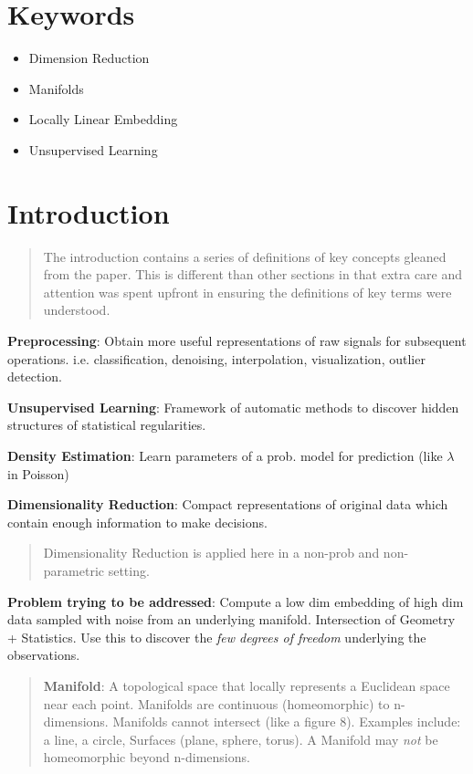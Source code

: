 \documentclass[11pt]{article}
\begin{document}
\section{Keywords}
\label{sec:orgb26bf41}
\begin{itemize}
\item Dimension Reduction
\item Manifolds
\item Locally Linear Embedding
\item Unsupervised Learning
\end{itemize}

\section{Introduction}
\label{sec:org8fafb44}

\begin{quote}
The introduction contains a series of definitions of key concepts gleaned from
the paper. This is different than other sections in that extra care and
attention was spent upfront in ensuring the definitions of key terms were understood.
\end{quote}

\textbf{Preprocessing}: Obtain more useful representations of raw signals for
 subsequent operations. i.e. classification, denoising, interpolation,
 visualization, outlier detection.

\textbf{Unsupervised Learning}: Framework of automatic methods to discover hidden structures of
 statistical regularities.

\textbf{Density Estimation}: Learn parameters of a prob. model for prediction (like \(\lambda\) in
Poisson)

\textbf{Dimensionality Reduction}: Compact representations of original data which
 contain enough information to make decisions.

\begin{quote}
Dimensionality Reduction is applied here in a non-prob and non-parametric setting.
\end{quote}

\textbf{Problem trying to be addressed}: Compute a low dim embedding of high dim data
 sampled with noise from an underlying manifold. Intersection of Geometry +
 Statistics. Use this to discover the \emph{few degrees of freedom} underlying the
 observations.

\begin{quote}
\textbf{Manifold}: A topological space that locally represents a Euclidean space near
 each point. Manifolds are continuous (homeomorphic) to n-dimensions. Manifolds cannot intersect (like a figure 8). Examples include: a
 line, a circle, Surfaces (plane, sphere, torus). A Manifold may \emph{not} be
 homeomorphic beyond n-dimensions.
\end{quote}
\end{document}
